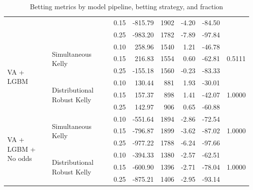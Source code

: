 \documentclass[12pt,twoside]{report}
\begin{document}
\begin{table}[!htb]
{\begin{tabular}{llrrrrrr}
                                     &                                              & 0.15     & -815.79     & 1902       & -4.20      & -84.50   &                          \\
                                     &                                              & 0.25     & -983.20     & 1782       & -7.89      & -97.84   &                          \\ 
\midrule
\multirow{6}{*}{VA + LGBM}           & \multirow{3}{*}{Simultaneous Kelly}          & 0.10     & 258.96      & 1540       & 1.21       & -46.78   & \multirow{3}{*}{0.5111}  \\
                                     &                                              & 0.15     & 216.83      & 1554       & 0.60       & -62.81   &                          \\
                                     &                                              & 0.25     & -155.18     & 1560       & -0.23      & -83.33   &                          \\ 
\cmidrule{2-8}
                                     & \multirow{3}{*}{Distributional Robust Kelly} & 0.10     & 130.44      & 881        & 1.93       & -30.01   & \multirow{3}{*}{1.0000}  \\
                                     &                                              & 0.15     & 157.37      & 898        & 1.41       & -42.07   &                          \\
                                     &                                              & 0.25     & 142.97      & 906        & 0.65       & -60.88   &                          \\ 
\midrule
\multirow{6}{*}{VA + LGBM + No odds} & \multirow{3}{*}{Simultaneous Kelly}          & 0.10     & -551.64     & 1894       & -2.86      & -72.54   & \multirow{3}{*}{1.0000}  \\
                                     &                                              & 0.15     & -796.87     & 1899       & -3.62      & -87.02   &                          \\
                                     &                                              & 0.25     & -977.22     & 1788       & -6.24      & -97.66   &                          \\ 
\cmidrule{2-8}
                                     & \multirow{3}{*}{Distributional Robust Kelly} & 0.10     & -394.33     & 1380       & -2.57      & -62.51   & \multirow{3}{*}{1.0000}  \\
                                     &                                              & 0.15     & -600.90     & 1396       & -2.71      & -78.04   &                          \\
                                     &                                              & 0.25     & -875.21     & 1406       & -2.95      & -93.14   &                          \\
\bottomrule
\end{tabular}
}
\caption{Betting metrics by model pipeline, betting strategy, and fraction}
\label{betting_results}
\end{table}
\normalsize
\end{document}
